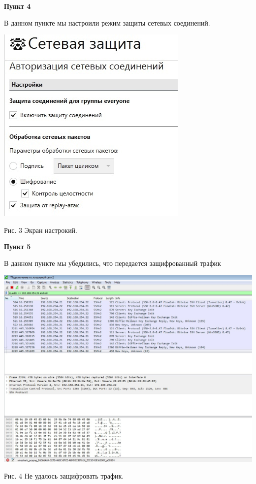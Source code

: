 \documentclass[a4paper,14pt]{extarticle}
\begin{document}
    \textbf{Пункт 4}
    \vspace{-3ex}
    \begin{center}
        \singlespacing
        В данном пункте мы настроили режим защиты сетевых соединений.

        \includegraphics[scale=0.6]{pics/4.jpg}

        Рис. 3 Экран настрокий.
    \end{center}

    \textbf{Пункт 5}
    \vspace{-3ex}
    \begin{center}
        \singlespacing
        В данном пункте мы убедились, что передается защифрованный трафик

        \includegraphics[scale=0.3]{pics/5.jpg}

        Рис. 4 Не удалось защифровать трафик.
    \end{center}
\end{document}
